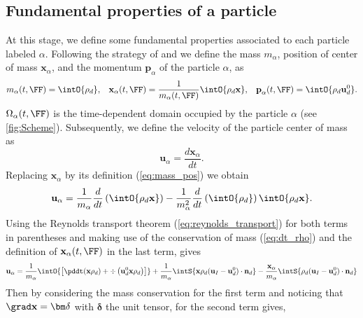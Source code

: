 \subsection{Fundamental properties of a particle}

At this stage, we define some fundamental properties associated to each particle labeled $\alpha$.
Following the strategy of \citet{lhuillier2009rheology,lhuillier1992volume,zaepffel2011modelisation} and \citet[Chapter 2]{morel2015mathematical}
we define the mass $m_\alpha$, position of center of mass $\mathbf{x}_\alpha$, and the momentum $\textbf{p}_\alpha$ of the particle $\alpha$, as
\begin{align}
    m_\alpha(t,\FF)
    = \intO{ \rho_d  }, 
    &&
    \textbf{x}_\alpha(t,\FF)
    = \frac{1}{m_\alpha(t,\FF) }\intO{ \rho_d \textbf{x} }, 
    &&\textbf{p}_\alpha(t,\FF) 
    = \intO{ \rho_d \textbf{u}_d^0 }.
    \label{eq:mass_pos}
\end{align}
$\Omega_\alpha(t,\FF)$ is the time-dependent domain occupied by the particle $\alpha$ (see \ref{fig:Scheme}). 
Subsequently, we define the velocity of the particle center of mass as
\begin{equation*}
\textbf{u}_\alpha = \frac{d \textbf{x}_\alpha}{dt}.
\end{equation*}
Replacing $\textbf{x}_\alpha$ by its definition (\ref{eq:mass_pos}) we obtain
\begin{equation*}
    \textbf{u}_\alpha = \frac{1}{m_\alpha}
    \frac{d}{dt} 
    \left(
        \intO{ \rho_d \textbf{x} }
    \right)
    - \frac{1}{m_\alpha^2} \frac{d}{dt} \left(\intO{ \rho_d } \right)
    \intO{ \rho_d \textbf{x} }.
\end{equation*}
Using the Reynolds transport theorem (\ref{eq:reynolds_transport}) for both terms in parentheses and making use of the conservation of mass (\ref{eq:dt_rho}) and the definition of $\textbf{x}_\alpha(t,\FF)$ in the last term, gives
\begin{equation}
    \textbf{u}_\alpha = 
    \frac{1}{m_\alpha}\intO{ \left[
        \pddt (\textbf{x}\rho_d ) + \div\left(\textbf{u}_d^0 \textbf{x} \rho_d\right) 
    \right]} \\
    + \frac{1}{m_\alpha}\intS{ \textbf{x} \rho_d(\textbf{u}_I   - \textbf{u}_d^0) \cdot \textbf{n}_d }
    -  \frac{\textbf{x}_\alpha}{m_\alpha}    \intS{ \rho_d(\textbf{u}_I   - \textbf{u}_d^0) \cdot \textbf{n}_d }
\end{equation}
Then by considering the mass conservation for the first term and noticing that $\grad \textbf{x} = \bm\delta$ with $\bm\delta$ the unit tensor, for the second term gives, 
